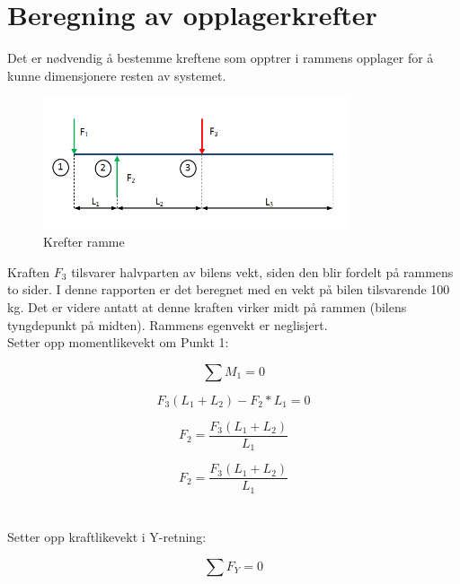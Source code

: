 \section{Beregning av opplagerkrefter}
Det er nødvendig å bestemme kreftene som opptrer i rammens opplager for å kunne dimensjonere resten av systemet.


\begin{figure}[H]
\begin{center}
\leavevmode
\includegraphics[width=0.8\textwidth]{images/Bilden_1}
\end{center}
\caption{Krefter ramme}
\label{fig:Krefter}
\end{figure}


Kraften $F_3$ tilsvarer halvparten av bilens vekt, siden den blir fordelt på rammens to sider. I denne rapporten er det beregnet med en vekt på bilen tilsvarende 100 kg. Det er videre antatt at denne kraften virker midt på rammen (bilens tyngdepunkt på midten). Rammens egenvekt er neglisjert. \\



Setter opp momentlikevekt om Punkt 1:

\begin{equation}
\sum{M_1}=0
\end{equation}

\begin{equation}
F_3(L_1+L_2)-F_2*L_1=0
\end{equation}
 
\begin{equation}
F_2=\frac{F_3(L_1+L_2)}{L_1}
\end{equation}

\begin{equation}
F_2=\frac{F_3(L_1+L_2)}{L_1}
\end{equation}\\\\

Setter opp kraftlikevekt i Y-retning:


\begin{equation}
\sum{F_Y}=0
\end{equation}

